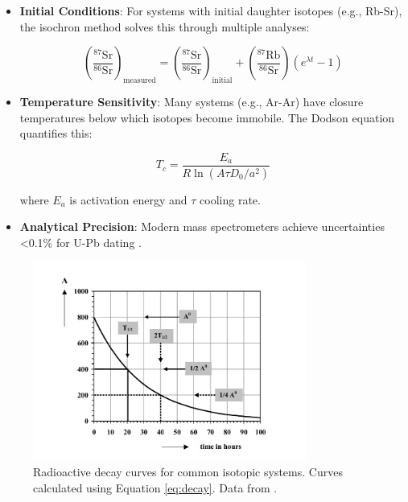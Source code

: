 \documentclass{article}
\begin{document}
\begin{itemize}
    \item \textbf{Initial Conditions}: For systems with initial daughter isotopes (e.g., Rb-Sr), the isochron method solves this through multiple analyses:
    
    \begin{equation}
        \left(\frac{^{87}\text{Sr}}{^{86}\text{Sr}}\right)_{\text{measured}} = \left(\frac{^{87}\text{Sr}}{^{86}\text{Sr}}\right)_{\text{initial}} + \left(\frac{^{87}\text{Rb}}{^{86}\text{Sr}}\right)(e^{\lambda t} - 1)
        \label{eq:isochron}
    \end{equation}
    
    \item \textbf{Temperature Sensitivity}: Many systems (e.g., Ar-Ar) have closure temperatures below which isotopes become immobile. The Dodson equation \cite{Dodson1973} quantifies this:
    
    \begin{equation}
        T_c = \frac{E_a}{R \ln(A\tau D_0/a^2)}
        \label{eq:dodson}
    \end{equation}
    
    where \( E_a \) is activation energy and \( \tau \) cooling rate.
    
    \item \textbf{Analytical Precision}: Modern mass spectrometers achieve uncertainties <0.1\% for U-Pb dating \cite{Schmitz2003}.
\end{itemize}

\begin{figure}[htbp]
    \centering
    \includegraphics[width=0.8\textwidth]{decay_curve.png}
    \caption{Radioactive decay curves for common isotopic systems. Curves calculated using Equation \eqref{eq:decay}. Data from \cite{Dickin2005}.}
    \label{fig:decay_curves}
\end{figure}
\end{document}
